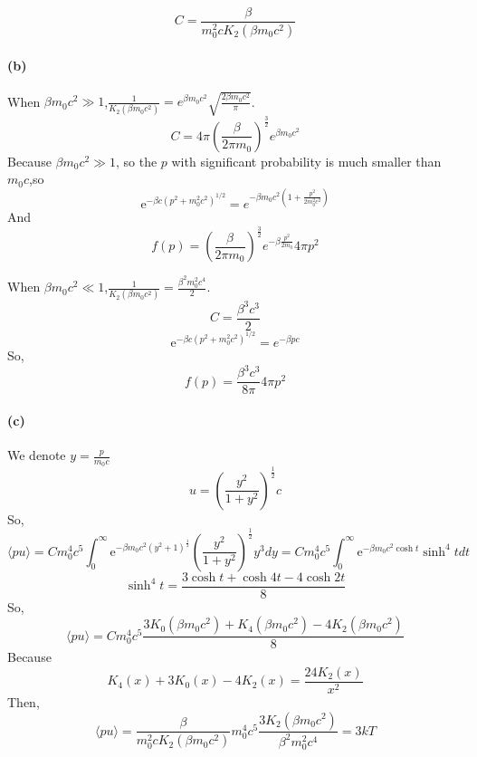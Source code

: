 \documentclass{article}
\begin{document}
\begin{equation}
C=\frac{\beta}{m_0^2 c K_2(\beta m_0 c^2)}
\end{equation}


\paragraph*{(b)}
When $\beta m_0c^2 \gg 1$,$\frac{1}{K_2(\beta m_0c^2)}=e^{\beta m_0c^2} \sqrt{\frac{2\beta m_0c^2}{\pi}}$.
\begin{equation}
C=4\pi (\frac{\beta}{2\pi m_0})^{\frac{3}{2}}e^{\beta m_0c^2}
\end{equation}
Because $\beta m_0 c^2 \gg 1$, so the $p$ with significant probability is much smaller than $m_0c$,so
\begin{equation}
\mathrm{e}^{-\beta c (p^2+m_0^2c^2)^{1/2}} = e^{-\beta m_0c^2(1+\frac{p^2}{2m_0^2c^2})}
\end{equation}
And
\begin{equation}
f(p) = (\frac{\beta}{2\pi m_0})^{\frac{3}{2}} e^{-\beta \frac{p^2}{2m_0}} 4\pi p^2
\end{equation}

When $\beta m_0c^2 \ll 1$,$\frac{1}{K_2(\beta m_0c^2)}= \frac{\beta^2 m_0^2 c^4}{2}$.
\begin{equation}
C=\frac{\beta^3 c^3}{2}
\end{equation}
\begin{equation}
\mathrm{e}^{-\beta c (p^2+m_0^2c^2)^{1/2}} = e^{-\beta pc}
\end{equation}
So,
\begin{equation}
f(p)=\frac{\beta^3 c^3}{8 \pi} 4\pi p^2 
\end{equation}

\paragraph*{(c)}
We denote $y=\frac{p}{m_0c}$
\begin{equation}
u=(\frac{y^2}{1+y^2})^{\frac{1}{2}} c 
\end{equation}
So,
\begin{equation}
\langle pu \rangle = C m_0^4c^5 \int_0^{\infty} \mathrm{e}^{-\beta m_0c^2 (y^2+1)^{\frac{1}{2}}} (\frac{y^2}{1+y^2})^{\frac{1}{2}} y^3 dy =  C m_0^4c^5 \int_0^{\infty} \mathrm{e}^{-\beta m_0c^2 \cosh t} \sinh^4 t dt
\end{equation}
\begin{equation}
\sinh^4t = \frac{3\cosh t + \cosh 4t - 4\cosh 2t}{8}
\end{equation}
So,
\begin{equation}
\langle pu \rangle = C m_0^4c^5 \frac{3K_0(\beta m_0c^2) + K_4(\beta m_0c^2)  - 4K_2(\beta m_0c^2)}{8}
\end{equation}
Because
\begin{equation}
K_4(x)+3K_0(x)-4K_2(x)= \frac{24K_2(x)}{x^2}
\end{equation}
Then,
\begin{equation}
\langle pu \rangle = \frac{\beta}{m_0^2 c K_2(\beta m_0 c^2)} m_0^4c^5 \frac{3K_2(\beta m_0 c^2)}{\beta^2 m_0^2 c^4} = 3kT
\end{equation}
\end{document}
